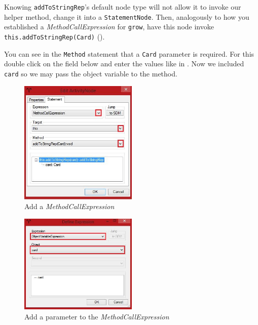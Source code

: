 \begin{stepbystep}
\clearpage

\item Knowing \texttt{addToStringRep}'s default node type will not allow it to invoke our helper method, change it
into a \texttt{StatementNode}. Then, analogously to how you established a \emph{MethodCallExpression} for \texttt{grow}, have this node invoke
\texttt{this.addToStringRep(Card)} (). 

\vspace{0.5cm}

\item You can see in the \texttt{Method} statement that a \texttt{Card} parameter is required. For this double click on the field below and enter the values like in . Now we included \texttt{card} so we may pass the object variable to the method.

\vspace{0.5cm}

\begin{figure}[htbp]
\begin{center}
  \includegraphics[width=0.5\textwidth]{../../org.moflon.doc.handbook.03_storyDiagrams/10_stringRep/visSRImages/ea_editStatementNode1}
  \caption{Add a \emph{MethodCallExpression}}
  \label{ea:editStatement1}
\end{center}
\end{figure}

\begin{figure}[htbp]
\begin{center}
  \includegraphics[width=0.5\textwidth]{../../org.moflon.doc.handbook.03_storyDiagrams/10_stringRep/visSRImages/ea_editStatementNode2}
  \caption{Add a parameter to the \emph{MethodCallExpression}}
  \label{ea:editStatement2}
\end{center}
\end{figure}


\end{stepbystep}

